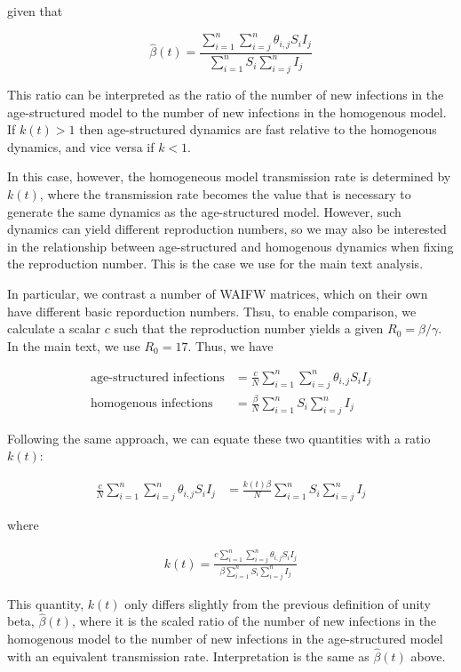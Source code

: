 \documentclass[12pt]{article}
\begin{document}
\noindent
given that 

$$
\hat{\beta}(t) = \frac{\sum_{i=1}^{n}\sum_{i=j}^{n} \theta_{i,j} S_i I_j}{\sum_{i=1}^{n}S_i\sum_{i=j}^{n}I_j}
$$

\noindent
This ratio can be interpreted as the ratio of the number of new infections in the age-structured model to the number of new infections in the homogenous model. If $k(t) > 1$ then age-structured dynamics are fast relative to the homogenous dynamics, and vice versa if $k < 1$.

In this case, however, the homogeneous model transmission rate is determined by $k(t)$, where the transmission rate becomes the value that is necessary to generate the same dynamics as the age-structured model. However, such dynamics can yield different reproduction numbers, so we may also be interested in the relationship between age-structured and homogenous dynamics when fixing the reproduction number. This is the case we use for the main text analysis. 

In particular, we contrast a number of WAIFW matrices, which on their own have different basic reporduction numbers. Thsu, to enable comparison, we calculate a scalar $c$ such that the reproduction number yields a given $R_0 = \beta/\gamma$. In the main text, we use $R_0 = 17$. Thus, we have

\begin{align}
    \text{age-structured infections} &=  \frac{c}{N}\sum_{i=1}^{n}\sum_{i=j}^{n} \theta_{i,j} S_i I_j \\
    \text{homogenous infections} &=  \frac{\beta}{N}\sum_{i=1}^{n} S_i \sum_{i=j}^{n} I_j
\end{align}

\noindent
Following the same approach, we can equate these two quantities with a ratio $k(t)$: 

\begin{align}
    \frac{c}{N}\sum_{i=1}^{n}\sum_{i=j}^{n} \theta_{i,j} S_i I_j &= \frac{k(t)\beta}{N}\sum_{i=1}^{n} S_i \sum_{i=j}^{n} I_j
\end{align}

\noindent
where

\begin{align}
    k(t) = \frac{c\sum_{i=1}^{n}\sum_{i=j}^{n} \theta_{i,j} S_i I_j}{\beta\sum_{i=1}^{n} S_i \sum_{i=j}^{n} I_j}
\end{align}

\noindent
This quantity, $k(t)$ only differs slightly from the previous definition of unity beta, $\hat{\beta}(t)$, where it is the scaled ratio of the number of new infections in the homogenous model to the number of new infections in the age-structured model with an equivalent transmission rate. Interpretation is the same as $\hat{\beta}(t)$ above.
\end{document}
